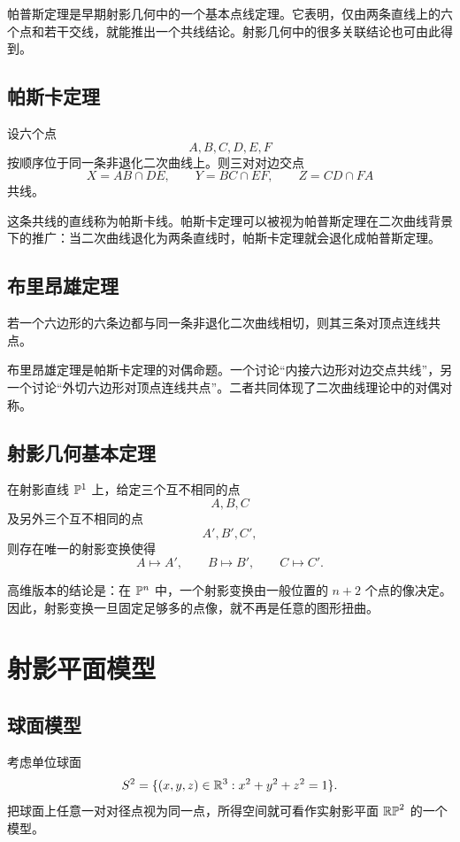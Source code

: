 帕普斯定理是早期射影几何中的一个基本点线定理。它表明，仅由两条直线上的六个点和若干交线，就能推出一个共线结论。射影几何中的很多关联结论也可由此得到。

\section{帕斯卡定理}
\begin{theorem}
设六个点
\[
A,B,C,D,E,F
\]
按顺序位于同一条非退化二次曲线上。则三对对边交点
\[
X=AB\cap DE,\qquad
Y=BC\cap EF,\qquad
Z=CD\cap FA
\]
共线。
\end{theorem}

这条共线的直线称为帕斯卡线。帕斯卡定理可以被视为帕普斯定理在二次曲线背景下的推广：当二次曲线退化为两条直线时，帕斯卡定理就会退化成帕普斯定理。

\section{布里昂雄定理}
\begin{theorem}
若一个六边形的六条边都与同一条非退化二次曲线相切，则其三条对顶点连线共点。
\end{theorem}

布里昂雄定理是帕斯卡定理的对偶命题。一个讨论“内接六边形对边交点共线”，另一个讨论“外切六边形对顶点连线共点”。二者共同体现了二次曲线理论中的对偶对称。

\section{射影几何基本定理}
\begin{theorem}
在射影直线 $\mathbb{P}^1$ 上，给定三个互不相同的点
\[
A,B,C
\]
及另外三个互不相同的点
\[
A',B',C',
\]
则存在唯一的射影变换使得
\[
A\mapsto A',\qquad B\mapsto B',\qquad C\mapsto C'.
\]
\end{theorem}

高维版本的结论是：在 $\mathbb{P}^n$ 中，一个射影变换由一般位置的 $n+2$ 个点的像决定。因此，射影变换一旦固定足够多的点像，就不再是任意的图形扭曲。

\chapter{射影平面模型}

\section{球面模型}
考虑单位球面
\[
S^2=\{(x,y,z)\in \mathbb{R}^3:x^2+y^2+z^2=1\}.
\]
把球面上任意一对对径点视为同一点，所得空间就可看作实射影平面 $\mathbb{RP}^2$ 的一个模型。

